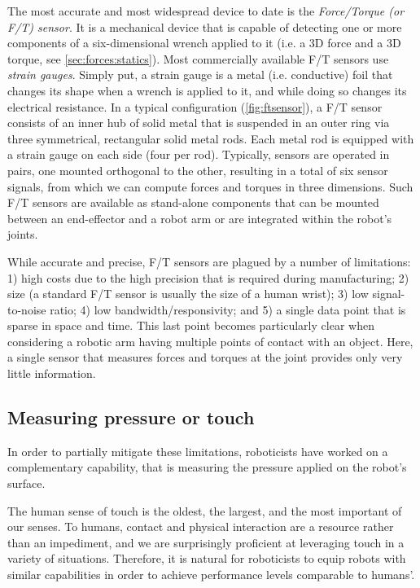 The most accurate and most widespread device to date is the \textsl{Force/Torque (or F/T) sensor}. It is a mechanical device that is capable of detecting one or more components of a six-dimensional wrench applied to it (i.e. a 3D force and a 3D torque, see \cref{sec:forces:statics}).
Most commercially available F/T sensors use  \textsl{strain gauges}. Simply put, a strain gauge is a metal (i.e. conductive) foil that changes its shape when a wrench is applied to it, and while doing so changes its electrical resistance. In a typical configuration (\cref{fig:ftsensor}), a F/T sensor consists of an inner hub of solid metal that is suspended in an outer ring via three symmetrical, rectangular solid metal rods. Each metal rod is equipped with a strain gauge on each side (four per rod). Typically, sensors are operated in pairs, one mounted orthogonal to the other, resulting in a total of six sensor signals, from which we can compute forces and torques in three dimensions. Such F/T sensors are available as stand-alone components that can be mounted between an end-effector and a robot arm or are integrated within the robot's joints. 

While accurate and precise, F/T sensors are plagued by a number of limitations: 1) high costs due to the high precision that is required during manufacturing; 2) size (a standard F/T sensor is usually the size of a human wrist); 3) low signal-to-noise ratio; 4) low bandwidth/responsivity; and 5) a single data point that is sparse in space and time. This last point becomes particularly clear when considering a robotic arm having multiple points of contact with an object. Here, a single sensor that measures forces and torques at the joint provides only very little information. 

\subsection{Measuring pressure or touch}
In order to partially mitigate these limitations, roboticists have worked on a complementary capability, that is measuring the pressure applied on the robot's surface.

The human sense of touch is the oldest, the largest, and the most important of our senses.
To humans, contact and physical interaction are a resource rather than an impediment, and we are surprisingly proficient at leveraging touch in a variety of situations.
Therefore, it is natural for roboticists to equip robots with similar capabilities in order to achieve performance levels comparable to humans'.

